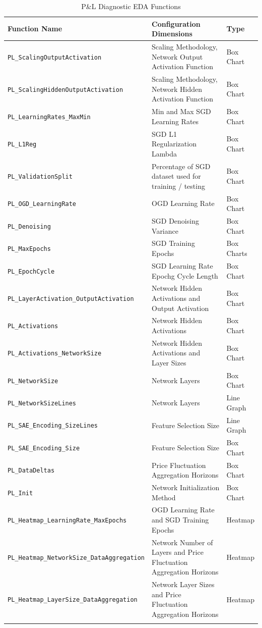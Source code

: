 \documentclass[a4paper,11pt,oneside]{article}
\theoremstyle{plain}
\theoremstyle{definition}
\begin{document}
\begin{longtable}{|p{0.5\linewidth}|p{0.4\linewidth}|p{0.1\linewidth}|}
		\hline
		\textbf{Function Name} &\textbf{Configuration Dimensions}&\textbf{Type}  \\\hline	
		\texttt{PL\_ScalingOutputActivation} & {Scaling Methodology, Network Output Activation Function}& {Box Chart} \\\hline
		\texttt{PL\_ScalingHiddenOutputActivation} & {Scaling Methodology, Network Hidden Activation Function}& {Box Chart} \\\hline
		\texttt{PL\_LearningRates\_MaxMin}& {Min and Max SGD Learning Rates} & {Box Chart} \\\hline
		\texttt{PL\_L1Reg} & {SGD L1 Regularization Lambda}& {Box Chart} \\\hline
		\texttt{PL\_ValidationSplit} & {Percentage of SGD dataset used for training / testing}& {Box Chart} \\\hline
		\texttt{PL\_OGD\_LearningRate}& {OGD Learning Rate} & {Box Chart} \\\hline
		\texttt{PL\_Denoising} & {SGD Denoising Variance}& {Box Chart} \\\hline
		\texttt{PL\_MaxEpochs} & {SGD Training Epochs}& {Box Charts} \\\hline
		\texttt{PL\_EpochCycle}& {SGD Learning Rate Epochg Cycle Length} & {Box Chart} \\\hline
		\texttt{PL\_LayerActivation\_OutputActivation} & {Network Hidden Activations and Output Activation}& {Box Chart} \\\hline
		\texttt{PL\_Activations} & {Network Hidden Activations}& {Box Chart} \\\hline
		\texttt{PL\_Activations\_NetworkSize}& {Network Hidden Activations and Layer Sizes} & {Box Chart} \\\hline
		\texttt{PL\_NetworkSize}& {Network Layers} & {Box Chart} \\\hline
		\texttt{PL\_NetworkSizeLines}& {Network Layers} & {Line Graph} \\\hline
		\texttt{PL\_SAE\_Encoding\_SizeLines}& {Feature Selection Size} & {Line Graph} \\\hline
		\texttt{PL\_SAE\_Encoding\_Size} & {Feature Selection Size}& {Box Chart} \\\hline
		\texttt{PL\_DataDeltas} & {Price Fluctuation Aggregation Horizons}& {Box Chart} \\\hline
		\texttt{PL\_Init}& {Network Initialization Method} & {Box Chart} \\\hline		
		\texttt{PL\_Heatmap\_LearningRate\_MaxEpochs} & {OGD Learning Rate and SGD Training Epochs}& {Heatmap} \\\hline
		\texttt{PL\_Heatmap\_NetworkSize\_DataAggregation} & {Network Number of Layers and Price Fluctuation Aggregation Horizons}& {Heatmap} \\\hline
		\texttt{PL\_Heatmap\_LayerSize\_DataAggregation}& {Network Layer Sizes and Price Fluctuation Aggregation Horizons } & {Heatmap} \\\hline

	\caption{P\&L Diagnostic EDA Functions}
	\label{tab_diagnostics_pl}
\end{longtable}
\end{document}
